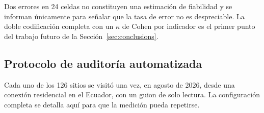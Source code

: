 \documentclass[pdflatex,sn-basic,Numbered]{sn-jnl}
\theoremstyle{thmstyleone}
\theoremstyle{thmstyletwo}
\theoremstyle{thmstylethree}
\begin{document}
Dos errores en 24 celdas no constituyen una estimaci\'on de fiabilidad y se informan \'unicamente para se\~nalar que la tasa de error no es despreciable. La doble codificaci\'on completa con un $\kappa$ de Cohen por indicador es el primer punto del trabajo futuro de la Secci\'on~\ref{sec:conclusions}.

\subsection{Protocolo de auditor\'ia automatizada}\label{sec:methods-audit}

Cada uno de los 126 sitios se visit\'o una vez, en agosto de 2026, desde una conexi\'on residencial en el Ecuador, con un guion de solo lectura. La configuraci\'on completa se detalla aqu\'i para que la medici\'on pueda repetirse.
\end{document}
